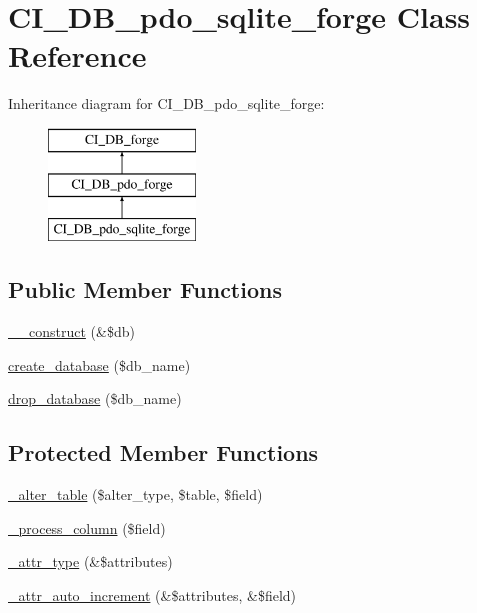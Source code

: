 \hypertarget{class_c_i___d_b__pdo__sqlite__forge}{}\section{C\+I\+\_\+\+D\+B\+\_\+pdo\+\_\+sqlite\+\_\+forge Class Reference}
\label{class_c_i___d_b__pdo__sqlite__forge}
Inheritance diagram for C\+I\+\_\+\+D\+B\+\_\+pdo\+\_\+sqlite\+\_\+forge\+:\begin{figure}[H]
\begin{center}
\leavevmode
\includegraphics[height=3.000000cm]{class_c_i___d_b__pdo__sqlite__forge}
\end{center}
\end{figure}
\subsection*{Public Member Functions}
\begin{DoxyCompactItemize}
\item 
\mbox{\hyperlink{class_c_i___d_b__pdo__sqlite__forge_aaf2ef772755ec6f361d44e16cc9ffd69}{\+\_\+\+\_\+construct}} (\&\$db)
\item 
\mbox{\hyperlink{class_c_i___d_b__pdo__sqlite__forge_a902a7267babceb2ce595706f217e00ad}{create\+\_\+database}} (\$db\+\_\+name)
\item 
\mbox{\hyperlink{class_c_i___d_b__pdo__sqlite__forge_a9612987b2d4230de2638d15857e92e67}{drop\+\_\+database}} (\$db\+\_\+name)
\end{DoxyCompactItemize}
\subsection*{Protected Member Functions}
\begin{DoxyCompactItemize}
\item 
\mbox{\hyperlink{class_c_i___d_b__pdo__sqlite__forge_a41c6cae02f2fda8b429ad0afb9509426}{\+\_\+alter\+\_\+table}} (\$alter\+\_\+type, \$table, \$field)
\item 
\mbox{\hyperlink{class_c_i___d_b__pdo__sqlite__forge_a8f38f1c5b5dddecca4befbe393f3f299}{\+\_\+process\+\_\+column}} (\$field)
\item 
\mbox{\hyperlink{class_c_i___d_b__pdo__sqlite__forge_a8553be952084c6f7cdfff370a1d14f6b}{\+\_\+attr\+\_\+type}} (\&\$attributes)
\item 
\mbox{\hyperlink{class_c_i___d_b__pdo__sqlite__forge_a2a013a5932439c3c44f0dad3436525f7}{\+\_\+attr\+\_\+auto\+\_\+increment}} (\&\$attributes, \&\$field)
\end{DoxyCompactItemize}
